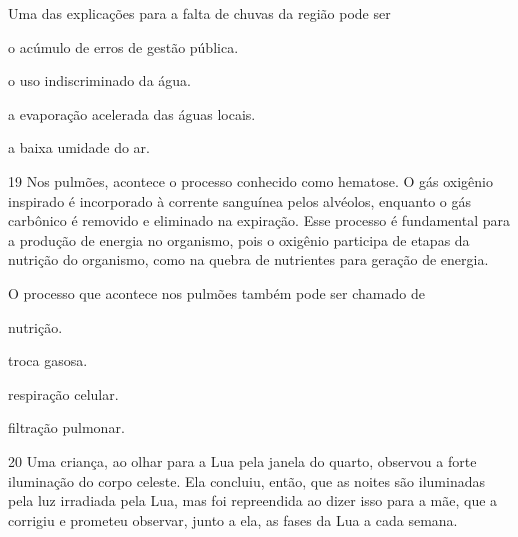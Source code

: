 Uma das explicações para a falta de chuvas da região pode ser

\begin{minipage}{.5\textwidth}
\begin{escolha}
\item o acúmulo de erros de gestão pública.

\item o uso indiscriminado da água.

\item a evaporação acelerada das águas locais.

\item a baixa umidade do ar.
\end{escolha}
\end{minipage}

\num{19} Nos pulmões, acontece o processo conhecido como hematose. O
gás oxigênio inspirado é incorporado à corrente sanguínea pelos
alvéolos, enquanto o gás carbônico é removido e eliminado na expiração.
Esse processo é fundamental para a produção de energia no organismo,
pois o oxigênio participa de etapas da nutrição do organismo, como na
quebra de nutrientes para geração de energia.

O processo que acontece nos pulmões também pode ser chamado de

\begin{minipage}{.5\textwidth}
\begin{escolha}
\item nutrição.

\item troca gasosa.

\item respiração celular.

\item filtração pulmonar.
\end{escolha}
\end{minipage}

\pagebreak
\num{20} Uma criança, ao olhar para a Lua pela janela do quarto,
observou a forte iluminação do corpo celeste. Ela concluiu, então, que
as noites são iluminadas pela luz irradiada pela Lua, mas foi
repreendida ao dizer isso para a mãe, que a corrigiu e prometeu
observar, junto a ela, as fases da Lua a cada semana.

